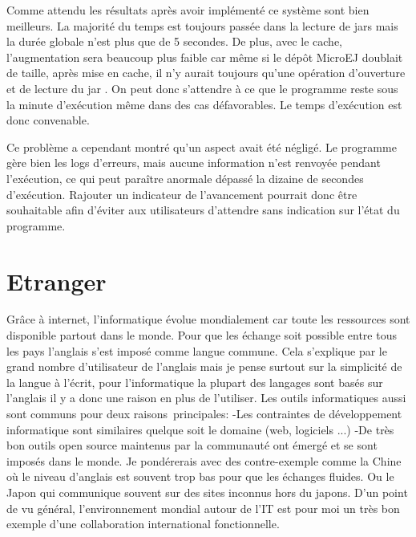 \documentclass[french,a4paper,12pt]{report}
\begin{document}
Comme attendu les résultats après avoir implémenté ce système sont bien meilleurs.
La majorité du temps est toujours passée dans la lecture de jars mais la durée globale n’est plus que de 5 secondes. De plus, avec le cache, l’augmentation sera beaucoup plus faible car même si le dépôt MicroEJ doublait de taille, après mise en cache, il n’y aurait toujours qu’une opération d’ouverture et de lecture du jar . On peut donc s’attendre à ce que le programme reste sous la minute d’exécution même dans des cas défavorables.  Le temps d’exécution est donc convenable.

Ce problème a cependant montré qu'un aspect avait été négligé. Le programme gère bien les logs d’erreurs, mais aucune information n’est renvoyée pendant l’exécution, ce qui peut paraître anormale dépassé la dizaine de secondes d’exécution. Rajouter un indicateur de l’avancement pourrait donc être souhaitable afin d’éviter aux utilisateurs d’attendre sans indication sur l’état du programme.

\chapter{Etranger}


Grâce à internet, l’informatique évolue mondialement car toute les ressources sont disponible partout dans le monde. Pour que les échange soit possible entre tous les pays  l’anglais s’est imposé comme langue commune. Cela s’explique par le grand nombre d’utilisateur de l’anglais mais je pense surtout sur la simplicité de la langue à l’écrit, pour l’informatique la plupart des langages sont basés sur l’anglais il y a donc une raison en plus de l’utiliser.
Les outils informatiques aussi sont communs pour deux raisons principales:
-Les contraintes de développement informatique sont similaires quelque soit le domaine (web, logiciels ...)
-De très bon outils open source maintenus par la communauté ont émergé et se sont imposés dans le monde.
Je pondérerais avec des contre-exemple comme la Chine où le niveau d’anglais est souvent trop bas pour que les échanges fluides. Ou le Japon qui communique souvent sur des sites inconnus hors du japons. 
D’un point de vu général, l’environnement mondial autour de l’IT est pour moi un très bon exemple d’une collaboration international fonctionnelle.\\
\end{document}
